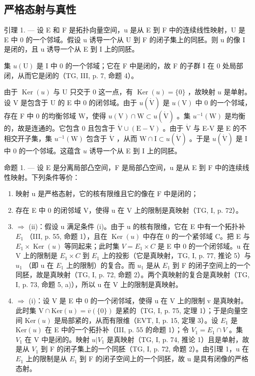 \subsection{严格态射与真性}

引理 1. --- 设 E 和 F 是拓扑向量空间，u 是从 E 到 F 中的连续线性映射，U 是 E 中 0 的一个邻域。假设 u 诱导一个从 U 到 F 的闭子集上的同胚。则 u 的像 I 是闭的，且 u 诱导一个从 E 到 I 上的同胚。

集 \(u(\mathrm{U})\) 是 I 中 0 的一个邻域；它在 F 中是闭的，故 F 的子群 I 在 0 处局部闭，从而它是闭的（TG, III, p. 7, 命题 4）。

由于 \(\operatorname{Ker}(u)\) 与 U 只交于 0 这一点，有 \(\operatorname{Ker}(u) = \{0\}\) ，故映射 \(u\) 是单射。设 V 是包含于 U 的 E 中 0 的闭邻域。由于 \(u(\mathring{\mathrm{V}})\) 是 \(u(\mathrm{V})\) 中 0 的一个邻域，存在 F 中 0 的均衡邻域 W，使得 \(u(\mathrm{V}) \cap \mathrm{W} \subset u(\mathring{\mathrm{V}})\) 。集 \(u^{-1}(\mathrm{W})\) 是均衡的，故是连通的。它包含 0 且包含于 \(\mathring{\mathrm{V}} \cup (\mathrm{E} - \mathrm{V})\) 。由于 \(\mathring{\mathrm{V}}\) 与 E-V 是 E 的不相交开子集，集 \(u^{-1}(\mathrm{W})\) 包含于 \(\mathring{\mathrm{V}}\) ，从而 \(\mathrm{W} \cap \mathrm{I} \subset u(\mathring{\mathrm{V}})\) 。于是 \(u(\mathring{\mathrm{V}})\) 是 I 中 0 的一个邻域。这蕴含 \(u\) 诱导一个从 E 到 I 上的同胚。

命题 1. --- 设 E 是分离局部凸空间，F 是局部凸空间，u 是从 E 到 F 中的连续线性映射。下列条件等价：

\begin{enumerate}
\def\labelenumi{(\roman{enumi})}
\item
  映射 u 是严格态射，它的核有限维且它的像在 F 中是闭的；
\item
  存在 E 中 0 的闭邻域 V，使得 u 在 V 上的限制是真映射（TG, I, p. 72）。
\item
  \(\Longrightarrow\) (ii)：假设 u 满足条件 (i)。由于 u 的核有限维，它在 E 中有一个拓扑补 \(E_{1}\) （III, p. 55, 命题 1），且在 \(\operatorname{Ker}(u)\) 中存在 0 的一个紧邻域 C。把 E 与 \(E_{1} \times \operatorname{Ker}(u)\) 等同起来；此时集 \(V = E_{1} \times C\) 是 E 中 0 的一个闭邻域。u 在 V 上的限制是 \(E_{1} \times C\) 到 \(E_{1}\) 上的投影（它是真映射，TG, I, p. 77, 推论 5）与 \(u_{1}\) （即 u 在 \(E_{1}\) 上的限制）的复合。而 \(u_{1}\) 是从 \(E_{1}\) 到 F 的闭子空间上的一个同胚，故是真映射（TG, I, p. 72, 命题 2）。两个真映射的复合是真映射（TG, I, p. 73, 命题 5, a)），所以 u 在 V 上的限制是真映射。
\item
  \(\Longrightarrow\) (i)：设 V 是 E 中 0 的一个闭邻域，使得 u 在 V 上的限制 v 是真映射。此时集 \(\mathrm{V} \cap \mathrm{Ker}(u) = \overline{v}(\{0\})\) 是紧的（TG, I, p. 75, 定理 1）；于是向量空间 \(\mathrm{Ker}(u)\) 是局部紧的，从而有限维（EVT, I, p. 15, 定理 3）。设 \(E_{1}\) 是 \(\mathrm{Ker}(u)\) 在 E 中的一个拓扑补（III, p. 55 的命题 1）；令 \(V_{1} = E_{1} \cap V\) 。集 \(V_{1}\) 在 V 中是闭的。映射 \(u|V_{1}\) 是真映射（TG, I, p. 74, 推论 1）且是单射，故是从 \(V_{1}\) 到 F 的闭子集上的一个同胚（TG, I, p. 72, 命题 2）。由引理 1，u 在 \(E_{1}\) 上的限制是从 \(E_{1}\) 到 F 的闭子空间上的一个同胚，故 u 是具有闭像的严格态射。
\end{enumerate}

